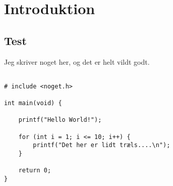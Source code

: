 \chapter{Introduktion}\label{ch:introduction}
\section{Test}

Jeg skriver noget her, og det er helt vildt godt.

\begin{verbatim}

# include <noget.h>

int main(void) {
    
    printf("Hello World!");
    
    for (int i = 1; i <= 10; i++) {
        printf("Det her er lidt træls....\n");
    }
    
    return 0;
}
\end{verbatim}